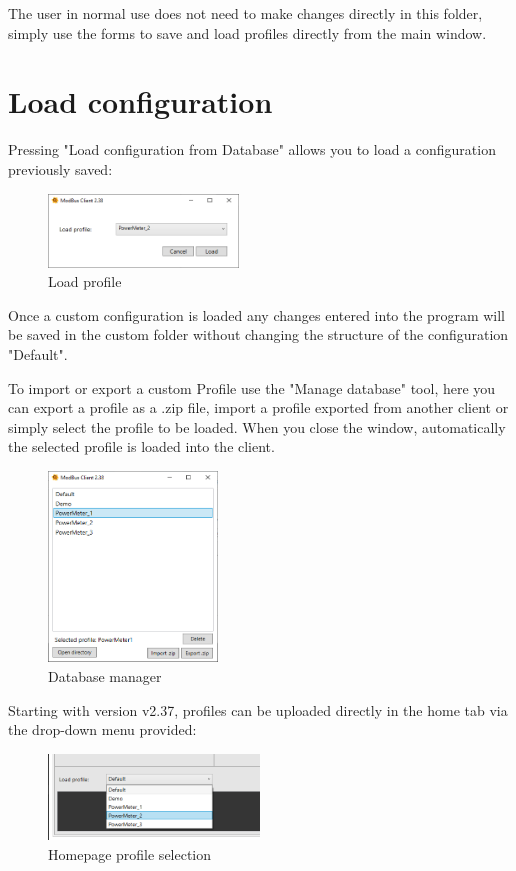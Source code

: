The user in normal use does not need to make changes directly in this folder, 
simply use the forms to save and load profiles directly from the main window.

\newpage
\section{Load configuration}

Pressing "Load configuration from Database" allows you to load a configuration
previously saved:

\begin{figure}[H]
\centering
\includegraphics[width=0.45\textwidth]{../Img/LoadProfile.PNG}
\caption{Load profile}
\end{figure}

Once a custom configuration is loaded any changes entered into the program
will be saved in the custom folder without changing the structure of the configuration
"Default".

To import or export a custom Profile use the "Manage database" tool,
here you can export a profile as a .zip file, import a profile 
exported from another client or simply select the profile to be loaded.
When you close the window, automatically the selected profile is loaded into the client.

\begin{figure}[H]
\centering
\includegraphics[width=0.40\textwidth]{../Img/DatabaseManager.PNG}
\caption{Database manager}
\end{figure}

Starting with version v2.37, profiles can be uploaded 
directly in the home tab via the drop-down menu provided:

\begin{figure}[H]
\centering
\includegraphics[width=0.50\textwidth]{../Img/ProfileHome.PNG}
\caption{Homepage profile selection}
\end{figure}